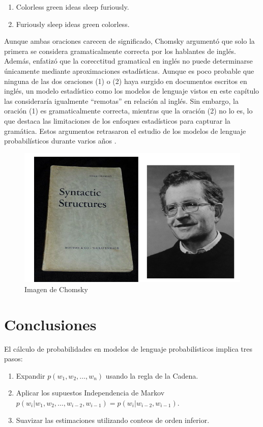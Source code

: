 \documentclass[11pt,fleqn]{book} %
\begin{document}
\begin{enumerate}
    \item Colorless green ideas sleep furiously.
    \item Furiously sleep ideas green colorless.
\end{enumerate}

Aunque ambas oraciones carecen de significado, Chomsky argumentó que solo la primera se considera gramaticalmente correcta por los hablantes de inglés. Además, enfatizó que la corecctitud gramatical en inglés no puede determinarse únicamente mediante aproximaciones estadísticas. Aunque es poco probable que ninguna de las dos oraciones (1) o (2) haya surgido en documentos escritos en inglés, un modelo estadístico como los modelos de lenguaje vistos en este capítulo las consideraría igualmente ``remotas'' en relación al inglés. Sin embargo, la oración (1) es gramaticalmente correcta, mientras que la oración (2) no lo es, lo que destaca las limitaciones de los enfoques estadísticos para capturar la gramática. Estos argumentos retrasaron el estudio de los modelos de lenguaje probabilísticos durante varios años \cite{JurafskyBook}.

\begin{figure}[h]
    \centering
    \includegraphics[scale = 0.4]{pics/chomsky.png}
    \caption{Imagen de Chomsky}
    \label{fig:chomsky}
\end{figure}


\section{Conclusiones}
El cálculo de probabilidades en modelos de lenguaje probabilísticos implica tres pasos:
    \begin{enumerate}
        \item Expandir $p(w_1, w_2, \ldots, w_n)$ usando la regla de la Cadena.
        \item Aplicar los supuestos Independencia de Markov \\
        $p(w_i | w_1, w_2, \ldots, w_{i-2}, w_{i-1}) = p(w_i | w_{i-2}, w_{i-1})$.
        \item Suavizar las estimaciones utilizando conteos de orden inferior.
    \end{enumerate}
    
\end{document}
